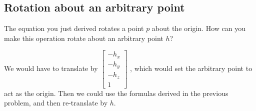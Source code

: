 \documentclass[10pt,twocolumn]{article}
\begin{document}
\subsection{Rotation about an arbitrary point}
\begin{framed}
\noindent{\bf [1 point]} The equation you just derived rotates a point $p$ about the origin. How can you make this operation rotate about an arbitrary point $h$?
\end{framed}

\begin{framed}

We would have to translate by 
$\begin{bmatrix}
	-h_x \\
	-h_y \\
	-h_z \\
	1 
	\end{bmatrix}$
, which would set the arbitrary point to act as the origin. Then we could use the formulas derived in the previous problem, and then re-translate by $h$.

\end{framed}
\end{document}
